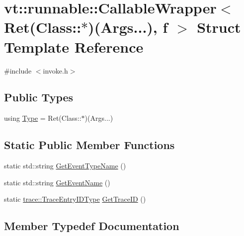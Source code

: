 \hypertarget{structvt_1_1runnable_1_1_callable_wrapper_3_01_ret_07_class_1_1_5_08_07_args_8_8_8_08_00_01f_01_4}{}\section{vt\+:\+:runnable\+:\+:Callable\+Wrapper$<$ Ret(Class\+:\+:$\ast$)(Args...), f $>$ Struct Template Reference}
\label{structvt_1_1runnable_1_1_callable_wrapper_3_01_ret_07_class_1_1_5_08_07_args_8_8_8_08_00_01f_01_4}


{\ttfamily \#include $<$invoke.\+h$>$}

\subsection*{Public Types}
\begin{DoxyCompactItemize}
\item 
using \hyperlink{structvt_1_1runnable_1_1_callable_wrapper_3_01_ret_07_class_1_1_5_08_07_args_8_8_8_08_00_01f_01_4_a48718cefa1c892ac7bc1a5f12880e206}{Type} = Ret(Class\+::$\ast$)(Args...)
\end{DoxyCompactItemize}
\subsection*{Static Public Member Functions}
\begin{DoxyCompactItemize}
\item 
static std\+::string \hyperlink{structvt_1_1runnable_1_1_callable_wrapper_3_01_ret_07_class_1_1_5_08_07_args_8_8_8_08_00_01f_01_4_a0c08379ceb7a7d040708ab70bcf91613}{Get\+Event\+Type\+Name} ()
\item 
static std\+::string \hyperlink{structvt_1_1runnable_1_1_callable_wrapper_3_01_ret_07_class_1_1_5_08_07_args_8_8_8_08_00_01f_01_4_a2cd81ad76e4e93b63af736e539ad8dd6}{Get\+Event\+Name} ()
\item 
static \hyperlink{namespacevt_1_1trace_a3c14050715ba9eceaeff51fb3de64f2f}{trace\+::\+Trace\+Entry\+I\+D\+Type} \hyperlink{structvt_1_1runnable_1_1_callable_wrapper_3_01_ret_07_class_1_1_5_08_07_args_8_8_8_08_00_01f_01_4_ac995f6f81128dc8df45ce13361122f50}{Get\+Trace\+ID} ()
\end{DoxyCompactItemize}


\subsection{Member Typedef Documentation}
\mbox{\label{structvt_1_1runnable_1_1_callable_wrapper_3_01_ret_07_class_1_1_5_08_07_args_8_8_8_08_00_01f_01_4_a48718cefa1c892ac7bc1a5f12880e206}} 
